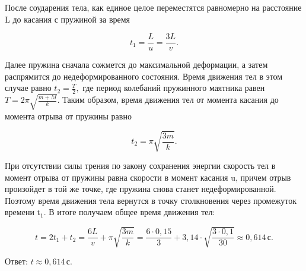 \documentclass[12pt,a4paper]{article}
\begin{document}
{После соударения тела, как единое целое переместятся равномерно на расстояние L до касания с пружиной за время

\[t_1= \frac{L}{u} = \frac{3L}{v} .\]

Далее пружина сначала сожмется до максимальной деформации, а затем распрямится до недеформированного состояния. Время движения тел в этом случае равно $t_2= \frac{T}{2} ,$ где период колебаний пружинного маятника равен $T=2 \pi \sqrt{\frac{m + M}{k}} .$
Таким образом, время движения тел от момента касания до момента отрыва от пружины равно

\[t_2= \pi \sqrt{\frac{3m}{k}} .\]

При отсутствии силы трения по закону сохранения энергии скорость тел в момент отрыва от пружины равна скорости в момент касания u, причем отрыв произойдет в той же точке, где пружина снова станет недеформированной. Поэтому время движения тела вернутся в точку столкновения через промежуток времени t$_{1}$.
В итоге получаем общее время движения тел:

\[t=2t_1 + t_2= \frac{6L}{v} + \pi \sqrt{\frac{3m}{k}} = \frac{6 \cdot 0{,}15}{3} + 3{,}14 \cdot \sqrt{\frac{3 \cdot 0{,}1}{30}} \approx 0{,}614\,\text{с} .\]

Ответ: $t \approx 0{,}614\,\text{с}.$
}
\end{document}
